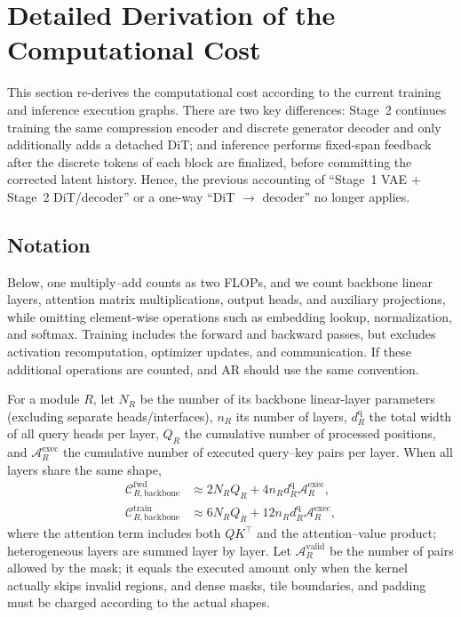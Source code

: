 \section{Detailed Derivation of the Computational Cost}
\label{app:compute-details}

This section re-derives the computational cost according to the current training and inference execution graphs. There are two key differences: Stage~2 continues training the same compression encoder and discrete generator decoder and only additionally adds a detached DiT; and inference performs fixed-span feedback after the discrete tokens of each block are finalized, before committing the corrected latent history. Hence, the previous accounting of ``Stage~1 VAE + Stage~2 DiT/decoder'' or a one-way ``DiT $\rightarrow$ decoder'' no longer applies.

\subsection{Notation}

Below, one multiply--add counts as two FLOPs, and we count backbone linear layers, attention matrix multiplications, output heads, and auxiliary projections, while omitting element-wise operations such as embedding lookup, normalization, and softmax. Training includes the forward and backward passes, but excludes activation recomputation, optimizer updates, and communication. If these additional operations are counted, \method and AR should use the same convention.

For a module $R$, let $N_R$ be the number of its backbone linear-layer parameters (excluding separate heads/interfaces), $n_R$ its number of layers, $d_R^{\mathrm q}$ the total width of all query heads per layer, $Q_R$ the cumulative number of processed positions, and $\mathcal A_R^{\mathrm{exec}}$ the cumulative number of executed query--key pairs per layer. When all layers share the same shape,
\begin{equation}
\begin{aligned}
    \mathcal C_{R,\mathrm{backbone}}^{\mathrm{fwd}}
    &\approx 2N_RQ_R+4n_Rd_R^{\mathrm q}\mathcal A_R^{\mathrm{exec}},\\
    \mathcal C_{R,\mathrm{backbone}}^{\mathrm{train}}
    &\approx 6N_RQ_R+12n_Rd_R^{\mathrm q}\mathcal A_R^{\mathrm{exec}},
\end{aligned}
\label{eq:app-cost-backbone-convention}
\end{equation}
where the attention term includes both $QK^\top$ and the attention--value product; heterogeneous layers are summed layer by layer. Let $\mathcal A_R^{\mathrm{valid}}$ be the number of pairs allowed by the mask; it equals the executed amount only when the kernel actually skips invalid regions, and dense masks, tile boundaries, and padding must be charged according to the actual shapes.

